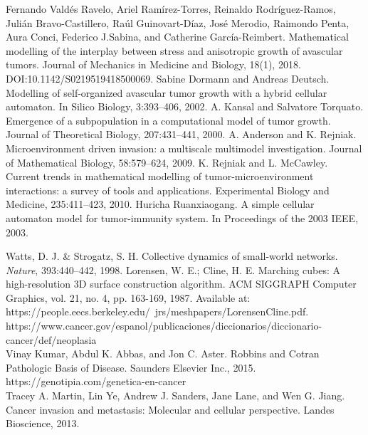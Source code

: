 \begin{thebibliography}{99}
\vskip 0.2cm
Fernando Vald\'es Ravelo, Ariel Ram\'irez-Torres, Reinaldo Rodr\'iguez-Ramos, Juli\'an Bravo-Castillero, Ra\'ul Guinovart-D\'iaz, Jos\'e Merodio, Raimondo Penta, Aura Conci, Federico J.Sabina, and Catherine Garc\'ia-Reimbert. Mathematical modelling of the interplay between stress and anisotropic growth of avascular tumors. Journal of Mechanics in Medicine and Biology, 18(1), 2018. DOI:10.1142/S0219519418500069.
\vskip 0.2cm
Sabine Dormann and Andreas Deutsch. Modelling of self-organized avascular tumor growth with a hybrid cellular automaton. In Silico Biology, 3:393–406, 2002.
\vskip 0.2cm
A. Kansal and Salvatore Torquato. Emergence of a subpopulation in a computational model of tumor growth. Journal of Theoretical Biology, 207:431–441, 2000.
\vskip 0.2cm
A. Anderson and K. Rejniak. Microenvironment driven invasion: a multiscale multimodel investigation. Journal of Mathematical Biology, 58:579–624, 2009.
\vskip 0.2cm
K. Rejniak and L. McCawley. Current trends in mathematical modelling of tumor-microenvironment interactions: a survey of tools and applications. Experimental Biology and Medicine, 235:411–423, 2010.
\vskip 0.2cm
Huricha Ruanxiaogang. A simple cellular automaton model for tumor-immunity system. In Proceedings of the 2003 IEEE, 2003.
    
\vskip 0.2cm
 Watts, D. J. \& Strogatz, S. H. Collective dynamics of small-world networks. \textit{Nature}, 393:440–442, 1998.
\vskip 0.2cm
 Lorensen, W. E.; Cline, H. E. Marching cubes: A high-resolution 3D surface construction algorithm. ACM SIGGRAPH Computer Graphics, vol. 21, no. 4, pp. 163-169, 1987. Available at: https://people.eecs.berkeley.edu/~jrs/meshpapers/LorensenCline.pdf.\\ 
\vskip 0.2cm
 https://www.cancer.gov/espanol/publicaciones/diccionarios/diccionario-cancer/def/neoplasia\\ 

\vskip 0.2cm
 Vinay Kumar, Abdul K. Abbas, and Jon C. Aster. Robbins and Cotran Pathologic Basis of Disease. Saunders Elsevier Inc., 2015.\\ 

\vskip 0.2cm
 https://genotipia.com/genetica-en-cancer\\ 

\vskip 0.2cm
 Tracey A. Martin, Lin Ye, Andrew J. Sanders, Jane Lane, and Wen G. Jiang. Cancer invasion and metastasis: Molecular and cellular perspective. Landes Bioscience, 2013.\\ 


\end{thebibliography}
